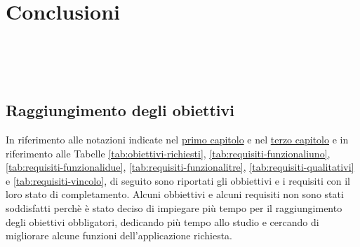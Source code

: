 \chapter{Conclusioni}
\label{cap:conclusioni}

\\

\\

\\ 

\section{Raggiungimento degli obiettivi}
In riferimento alle notazioni indicate nel \hyperref[sec:obbiettivi]{primo capitolo} e nel \hyperref[sec:requisiti]{terzo capitolo} e in riferimento alle Tabelle \ref{tab:obiettivi-richiesti}, \ref{tab:requisiti-funzionaliuno}, \ref{tab:requisiti-funzionalidue}, \ref{tab:requisiti-funzionalitre}, \ref{tab:requisiti-qualitativi} e \ref{tab:requisiti-vincolo}, di seguito sono riportati gli obbiettivi e i requisiti con il loro stato di completamento.\newline
Alcuni obbiettivi e alcuni requisiti non sono stati soddisfatti perchè è stato deciso di impiegare più tempo per il raggiungimento degli obiettivi obbligatori, dedicando più tempo allo studio e cercando di migliorare alcune funzioni dell'applicazione richiesta.\newline


